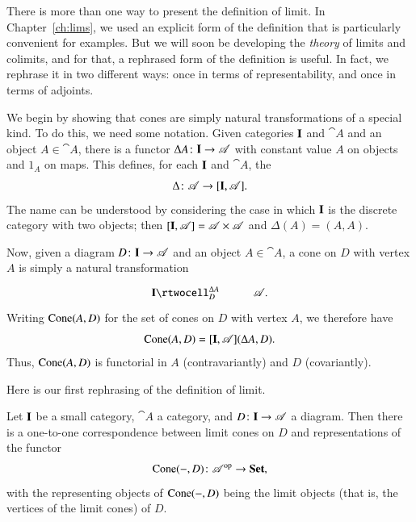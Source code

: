 There is more than one way to present the definition of limit.  In
Chapter~\ref{ch:lims}, we used an explicit form of the definition that is
particularly convenient for examples.  But we will soon be developing the
\emph{theory} of limits and colimits, and for that, a rephrased form of the
definition is useful.  In fact, we rephrase it in two different ways: once
in terms of representability, and once in terms of adjoints.

We begin by showing that cones are simply natural transformations of a
special kind.  To do this, we need some notation.  Given categories
$\mathbf{I}$ and $\cat{A}$ and an object $A \in \cat{A}$, there is a functor
$\Delta A\from \scat{I} \to \cat{A}$ with constant value $A$ on objects and
$1_A$ on maps.  This defines, for each $\mathbf{I}$ and $\cat{A}$, the
\[
\Delta\from \cat{A} \to \ftrcat{\scat{I}}{\cat{A}}.%
%
\ntn{diag-gen}
%
\]
The name can be understood by considering the case in which $\mathbf{I}$ is the
discrete category with two objects; then $[\mathbf{I},\mathscr{A}] = \mathscr{A}
\times \mathscr{A}$ and $\Delta(A) = (A, A)$.

Now, given a diagram $D\from \scat{I} \to \cat{A}$ and an object $A \in
\cat{A}$, a cone on $D$ with vertex $A$ is simply%
%
%
a natural transformation
\[
\xymatrix{
\scat{I} \rtwocell^{\Delta A}_{D} &\cat{A}.
}
\]
Writing $\operatorname{Cone}(A, D)$%
%
%
for the set of cones on $D$ with vertex $A$, we therefore have
%
\begin{equation}
\label{eq:cones-as-transfs}
\operatorname{Cone}(A, D)
=
[\mathbf{I},\mathscr{A}] (\Delta A, D).
\end{equation}
%
Thus, $\operatorname{Cone}(A, D)$ is functorial in $A$ (contravariantly) and $D$
(covariantly).

Here is our first rephrasing of the definition of limit.

\begin{propn}
\label{propn:lim-rep}
%
%
Let $\mathbf{I}$ be a small category, $\cat{A}$ a category, and $D\from \scat{I}
\to \cat{A}$ a diagram.  Then there is a one-to-one correspondence between
limit cones on $D$ and representations of the functor
\[
\Cone(\dashbk, D) \from \cat{A}^\op \to \Set,
\]
with the representing objects of \hspace{.05em}$\operatorname{Cone}(-, D)$ being the
limit objects (that is, the vertices of the limit cones) of $D$.
\end{propn}

